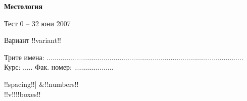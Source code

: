\documentclass[a4paper,10pt]{report}
\begin{document}
%		


\begin{center}
{\Large\textbf{Местология}} %

Тест 0 – 32 юни 2007 %

Вариант !!variant!! %
\end{center} 
Трите имена: ....................................................................................................   Курс: ..... Фак. номер: ....................
\newcommand{\columnFormat}{|@{}c@{}}

\begin{tabular}{!!spacing!!|}
\hline
&!!numbers!!\\
\hline
 \tableExtra
\hline
!!v!!!!boxes!!\\
\hline
\end{tabular} 


\setlength{\parindent}{0mm}
\setlength{\parskip}{0cm} 
\setlength{\baselineskip}{0cm} 
\setlength{\itemsep}{-1cm} 
\end{document}

